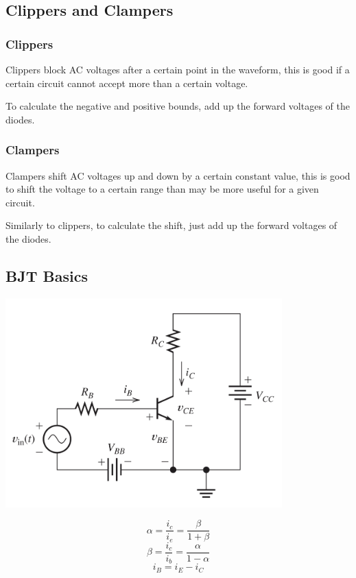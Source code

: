\documentclass{article}
\begin{document}
\subsection*{Clippers and Clampers}
\subsubsection*{Clippers}
\begin{center}
    Clippers block AC voltages after a certain point in the waveform, this is good if a certain circuit cannot accept more than a certain voltage.
    
    To calculate the negative and positive bounds, add up the forward voltages of the diodes.
\end{center}
\subsubsection*{Clampers}
\begin{center}
    Clampers shift AC voltages up and down by a certain constant value, this is good to shift the voltage to a certain range than may be more useful for a given circuit.
    
    Similarly to clippers, to calculate the shift, just add up the forward voltages of the diodes.
\end{center}
\subsection*{BJT Basics}
\begin{center}
    \includegraphics[width = .5 \textwidth]{basicBJT.png}
\end{center}
\begin{equation}
    \alpha = \frac{i_c}{i_e} = \frac{\beta}{1 + \beta}
\end{equation}
\begin{equation}
    \beta = \frac{i_c}{i_b} = \frac{\alpha}{1-\alpha}
\end{equation}
\begin{equation}
    i_B = i_E - i_C
\end{equation}
\end{document}
